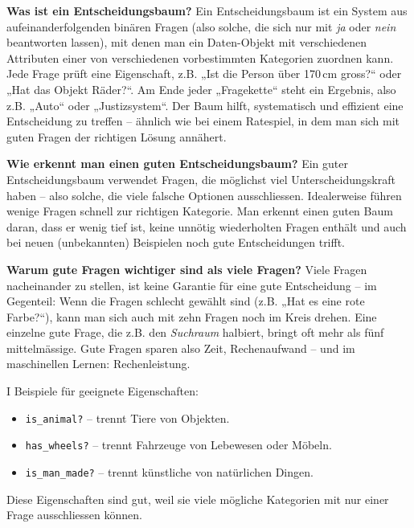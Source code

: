 \begin{aufgabe}{7}
\textbf{Was ist ein Entscheidungsbaum?}
Ein Entscheidungsbaum ist ein System aus aufeinanderfolgenden binären Fragen (also solche, die sich nur mit \textit{ja} oder \textit{nein} beantworten lassen), mit denen man ein Daten-Objekt mit verschiedenen Attributen einer von verschiedenen vorbestimmten Kategorien zuordnen kann. Jede Frage prüft eine Eigenschaft, z.B. „Ist die Person über 170 cm gross?“ oder „Hat das Objekt Räder?“. Am Ende jeder „Fragekette“ steht ein Ergebnis, also z.B. „Auto“ oder „Justizsystem“. Der Baum hilft, systematisch und effizient eine Entscheidung zu treffen – ähnlich wie bei einem Ratespiel, in dem man sich mit guten Fragen der richtigen Lösung annähert.

\textbf{Wie erkennt man einen guten Entscheidungsbaum?}
Ein guter Entscheidungsbaum verwendet Fragen, die möglichst viel Unterscheidungskraft haben – also solche, die viele falsche Optionen ausschliessen. Idealerweise führen wenige Fragen schnell zur richtigen Kategorie. Man erkennt einen guten Baum daran, dass er wenig tief ist, keine unnötig wiederholten Fragen enthält und auch bei neuen (unbekannten) Beispielen noch gute Entscheidungen trifft.

\textbf{Warum gute Fragen wichtiger sind als viele Fragen?}
Viele Fragen nacheinander zu stellen, ist keine Garantie für eine gute Entscheidung – im Gegenteil: Wenn die Fragen schlecht gewählt sind (z.B. „Hat es eine rote Farbe?“), kann man sich auch mit zehn Fragen noch im Kreis drehen. Eine einzelne gute Frage, die z.B. den \textit{Suchraum} halbiert, bringt oft mehr als fünf mittelmässige. Gute Fragen sparen also Zeit, Rechenaufwand – und im maschinellen Lernen: Rechenleistung.
\end{aufgabe}



\begin{aufgabe}{I}
Beispiele für geeignete Eigenschaften:
\begin{itemize}
  \item \texttt{is\_animal?} – trennt Tiere von Objekten.
  \item \texttt{has\_wheels?} – trennt Fahrzeuge von Lebewesen oder Möbeln.
  \item \texttt{is\_man\_made?} – trennt künstliche von natürlichen Dingen.
\end{itemize}
Diese Eigenschaften sind gut, weil sie viele mögliche Kategorien mit nur einer Frage ausschliessen können.
\end{aufgabe}

